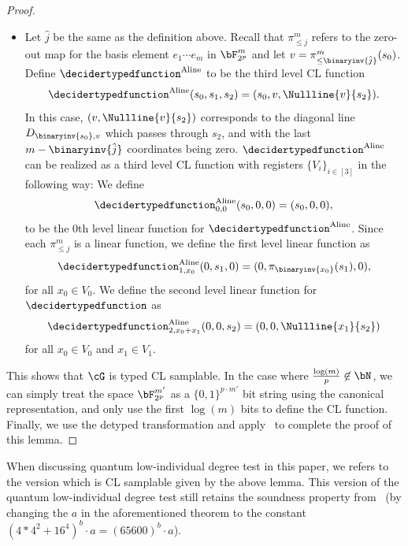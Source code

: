 \begin{proof}
\begin{itemize}
\begin{equation*}
	\end{equation*}
	\item Let $\hat{j}$ be the same as the definition above. Recall that $\pi_{\leq j}^m$ refers to the zero-out map for the basis element $e_1 \cdots e_m$ in $\bF_{2^p}^m$ and let $v = \pi_{\leq \binaryinv{\hat{j}}}^m(s_0)$.  Define $\decidertypedfunction^{\text{Aline}}$ to be the third level CL function
	\begin{equation*}
		\decidertypedfunction^{\text{Aline}}(s_0, s_1, s_2) = (s_0 , v , \Nullline{v}{s_2}).
	\end{equation*}
	 In this case, $(v,\Nullline{v}{s_2})$ corresponds to the diagonal line $D_{\binaryinv{s_0}, v}$ which passes through $s_2$, and with the last $m - \binaryinv{\hat{j}}$ coordinates being zero. $\decidertypedfunction^{\text{Aline}}$ can be realized as a third level CL function with registers $\{V_i\}_{i \in [3]}$ in the following way: We define
	\begin{equation*}
		\decidertypedfunction_{0,0}^{\text{Aline}}(s_0,0,0) = (s_0,0,0),
	\end{equation*}
	to be the $0$th level linear function for $\decidertypedfunction^{\text{Aline}}$. Since each $\pi_{\leq j}^m$ is a linear function, we define the first level linear function as 
	\begin{equation*}
		\decidertypedfunction_{1,x_0}^{\text{Aline}}(0,s_1,0) = (0,\pi_{\binaryinv{x_0}}(s_1),0),
	\end{equation*}
	for all $x_0 \in V_0$. We define the second level linear function for $\decidertypedfunction$ as
	\begin{equation*}
		\decidertypedfunction_{2, x_0 + x_1}^{\text{Aline}}(0,0, s_2) = (0,0,\Nullline{x_1}{s_2})
	\end{equation*}
	for all $x_0 \in V_0$ and $x_1 \in V_1$.
\end{itemize}
This shows that $\cG$ is typed CL samplable. In the case where $\frac{\log(m)}{p} \not \in \bN$, we can simply treat the space $\bF_{2^p}^{m'}$ as a $\{0,1\}^{p \cdot m'}$ bit string using the canonical representation, and only use the first $\log(m)$ bits to define the CL function. Finally, we use the detyped transformation and apply~ to complete the proof of this lemma. 
\end{proof}

When discussing quantum low-individual degree test in this paper, we refers to the version which is CL samplable given by the above lemma. This version of the quantum low-individual degree test still retains the soundness property from~ (by changing the $a$ in the aforementioned theorem to the constant $ (4 * 4^2 + 16^4)^b \cdot a = (65600)^b \cdot a$). 

